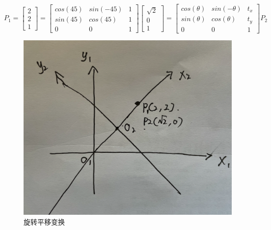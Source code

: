 \documentclass[12pt]{article}
\begin{document}
\begin{equation}
    \nonumber
    P_1=\left[
        \begin{array}{l}
            2\\
            2\\
            1
        \end{array}
    \right]=
    \left[
        \begin{array}{lll}
            cos(45) & sin(-45) & 1\\
            sin(45) & cos(45) & 1 \\
            0  &  0  & 1
        \end{array}
    \right]
    \left[
        \begin{array}{l}
            \sqrt{2} \\
            0 \\
            1
        \end{array}
    \right]=
    \left[
        \begin{array}{lll}
            cos(\theta) & sin(-\theta) & t_x\\
            sin(\theta) & cos(\theta) & t_y \\
            0  &  0  & 1
        \end{array}
    \right]
    P_2
\end{equation}
\begin{figure}[ht]
    \centering
    \includegraphics[scale=0.4]{./img/bianhuan.png}
    \caption{旋转平移变换}
    \label{fig:bh}
\end{figure}
\end{document}
